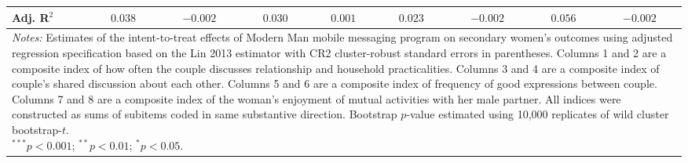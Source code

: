 \begin{tabular}{l c c c c c c c c}
Adj. R$^2$          & $0.038$        & $-0.002$       & $0.030$        & $0.001$       & $0.023$        & $-0.002$       & $0.056$        & $-0.002$       \\
\bottomrule
\multicolumn{9}{l}{\scriptsize{\parbox{\linewidth}{\vspace{2pt}
       \textit{Notes:} Estimates of the intent-to-treat effects of Modern Man mobile
       messaging program on secondary women's outcomes using adjusted regression
       specification based on the Lin 2013 estimator with CR2 cluster-robust
       standard errors in parentheses. Columns 1 and 2 are a composite index of
       how often the couple discusses relationship and household practicalities. 
       Columns 3 and 4 are a composite index of couple's shared discussion about each other.
       Columns 5 and 6 are a composite index of frequency of good expressions between couple.
       Columns 7 and 8 are a composite index of the woman's enjoyment of mutual activities with 
       her male partner. All indices were constructed as sums of subitems coded in
       same substantive direction. Bootstrap $p$-value estimated using 10,000 replicates of wild cluster bootstrap-$t$. \\ $^{***}p<0.001$; $^{**}p<0.01$; $^{*}p<0.05$.}}}
\end{tabular}
